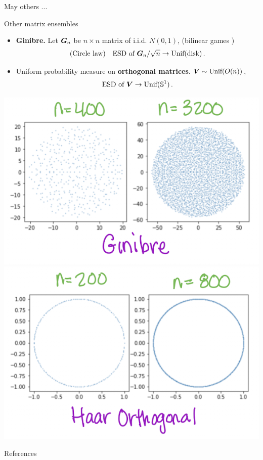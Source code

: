 \documentclass[10pt, aspectratio=169]{beamer}
\begin{document}
\begin{frame}{May others ...}
\begin{exampleblock}{Other matrix ensembles}
\begin{itemize}
    \item {\bfseries Ginibre.} Let ${\boldsymbol G}_n$ be $n \times n$ matrix of i.i.d. $N(0,1)$, {\footnotesize(bilinear games \citep{domingo2020average})}
    \[\text{(Circle law)} \quad \text{ESD of ${\boldsymbol G}_n/\sqrt{n} \to \text{Unif}(\text{disk})\,.$}\]
    \item 
    Uniform probability measure on {\bfseries orthogonal matrices}. ${\boldsymbol V} \sim \text{Unif}(O(n))$,
    \[  \text{ESD of ${\boldsymbol V}$} \to  \text{Unif}(\mathbb{S}^1)\,.\]
\end{itemize}
\end{exampleblock}

\begin{center}
\includegraphics[scale = 0.5]{part-2-images/Ginibre.png}\hspace{0.2cm} 
    \includegraphics[scale = 0.5]{part-2-images/Haar.png} 
\end{center}
\end{frame}


\appendix



\begin{frame}[allowframebreaks]{References}

  
  {\scriptsize}

\end{frame}
\end{document}
